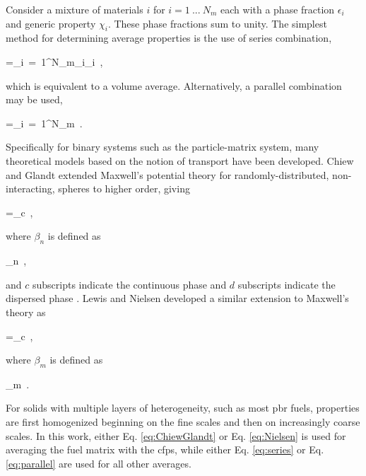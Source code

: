 
Consider a mixture of materials \(i\) for \(i=1\ ...\ N_m\) each with a phase fraction \(\epsilon_i\) and generic property \(\chi_i\). These phase fractions sum to unity. The simplest method for determining average properties is the use of series combination,

\beq
\label{eq:series}
\chi=\sum_{i\ =\ 1}^{N_m}\epsilon_i\chi_i\ ,
\eeq

\noindent which is equivalent to a volume average. Alternatively, a parallel combination may be used,

\beq
\label{eq:parallel}
=\sum_{i\ =\ 1}^{N_m}\ .
\eeq

\noindent Specifically for binary systems such as the particle-matrix system, many theoretical models based on the notion of transport have been developed. Chiew and Glandt extended Maxwell's potential theory for randomly-distributed, non-interacting, spheres \cite{progelhof} to higher order, giving

\beq
\label{eq:ChiewGlandt}
\chi=\chi_c\ ,
\eeq

\noindent where \(\beta_n\) is defined as

\beq
\label{eq:betanDef}
\beta_n\equiv{}\ ,
\eeq

\noindent and \(c\) subscripts indicate the continuous phase and \(d\) subscripts indicate the dispersed phase \cite{kamalpour,liu,gonzo,folsom}. Lewis and Nielsen developed a similar extension to Maxwell's theory as \cite{nielsen,progelhof}

\beq
\label{eq:Nielsen}
\chi=\chi_c\ ,
\eeq

\noindent where \(\beta_m\) is defined as

\beq
\label{eq:BmDef}
\beta_m\equiv{}\ .
\eeq

\noindent For solids with multiple layers of heterogeneity, such as most \gls{pbr} fuels, properties are first homogenized beginning on the fine scales and then on increasingly coarse scales. In this work, either Eq. \eqref{eq:ChiewGlandt} or Eq. \eqref{eq:Nielsen} is used for averaging the fuel matrix with the \glspl{cfp}, while either Eq. \eqref{eq:series} or Eq. \eqref{eq:parallel} are used for all other averages. 

